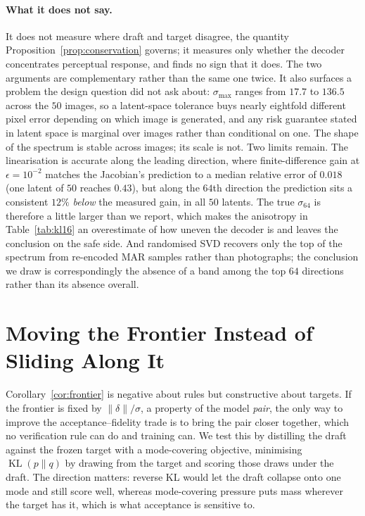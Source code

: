 \documentclass[10pt]{article}
\DeclareMathOperator{\KL}{KL}
\begin{document}
\paragraph{What it does not say.} It does not measure where draft and target disagree, the quantity
Proposition~\ref{prop:conservation} governs; it measures only whether the decoder concentrates
perceptual response, and finds no sign that it does. The two arguments are complementary rather than
the same one twice. It also surfaces a problem the design question did not ask about:
$\sigma_{\max}$ ranges from $17.7$ to $136.5$ across the $50$ images, so a latent-space tolerance
buys nearly eightfold different pixel error depending on which image is generated, and any risk
guarantee stated in latent space is marginal over images rather than conditional on one. The shape of
the spectrum is stable across images; its scale is not. Two limits remain. The linearisation is
accurate along the leading direction, where finite-difference gain at $\epsilon = 10^{-2}$ matches the
Jacobian's prediction to a median relative error of $0.018$ (one latent of $50$ reaches $0.43$), but
along the $64$th direction the prediction sits a consistent $12\%$ \emph{below} the measured gain, in
all $50$ latents. The true $\sigma_{64}$ is therefore a little larger than we report, which makes the
anisotropy in Table~\ref{tab:kl16} an overestimate of how uneven the decoder is and leaves the
conclusion on the safe side. And randomised SVD recovers only the top of the spectrum from re-encoded MAR
samples rather than photographs; the conclusion we draw is correspondingly the absence of a band
among the top $64$ directions rather than its absence overall.

\section{Moving the Frontier Instead of Sliding Along It}
\label{sec:moving}

Corollary~\ref{cor:frontier} is negative about rules but constructive about targets. If the frontier
is fixed by $\|\delta\|/\sigma$, a property of the model \emph{pair}, the only way to improve the
acceptance--fidelity trade is to bring the pair closer together, which no verification rule can do
and training can. We test this by distilling the draft against the frozen target with a mode-covering
objective, minimising $\KL(p\|q)$ by drawing from the target and scoring those draws under the draft.
The direction matters: reverse KL would let the draft collapse onto one mode and still score well,
whereas mode-covering pressure puts mass wherever the target has it, which is what acceptance is
sensitive to.
\end{document}
